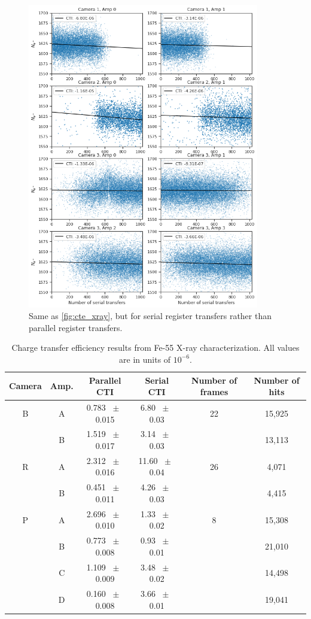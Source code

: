 \begin{figure}
    \centering
    \includegraphics[width=0.9\textwidth]{figures/cte/xray_cte_serial.png}
    \caption{Same as \ref{fig:cte_xray}, but for serial register transfers rather than parallel register transfers.}
    \label{fig:cte_xray_serial}
\end{figure}

\begin{table}[]
    \centering
    \begin{tabular}{|c|c|c|c|c|c|}\hline
        Camera & Amp. & Parallel CTI & Serial CTI & Number of frames & Number of hits \\\hline
        B & A &0.783 $\;\pm\;$ 0.015 & 6.80 $\;\pm\;$ 0.03 & 22 & 15,925 \\
          & B &1.519 $\;\pm\;$ 0.017 & 3.14 $\;\pm\;$ 0.03 &    & 13,113 \\\hline
        R & A &2.312 $\;\pm\;$ 0.016 & 11.60 $\;\pm\;$ 0.04 & 26 & 4,071 \\
          & B &0.451 $\;\pm\;$ 0.011 & 4.26 $\;\pm\;$ 0.03 &    & 4,415 \\\hline
        P & A &2.696 $\;\pm\;$ 0.010 & 1.33 $\;\pm\;$ 0.02 & 8 & 15,308 \\
          & B &0.773 $\;\pm\;$ 0.008 & 0.93 $\;\pm\;$ 0.01 &   & 21,010 \\
          & C &1.109 $\;\pm\;$ 0.009 & 3.48 $\;\pm\;$ 0.02 &   & 14,498 \\
          & D &0.160 $\;\pm\;$ 0.008 & 3.66 $\;\pm\;$ 0.01 &   & 19,041 \\\hline
    \end{tabular}
    \caption{Charge transfer efficiency results from Fe-55 X-ray characterization. All values are in units of $10^{-6}$.}
    \label{tab:cte_xray}
\end{table}

